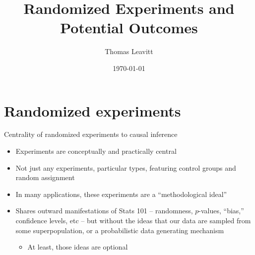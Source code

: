 \documentclass[table, xcolor = {dvipsnames}, 9pt]{beamer}
\title[]{Randomized Experiments and Potential Outcomes} %
\author{Thomas Leavitt} %
\institute[] %
{
\medskip
\textit{} %
}
\date{\today} %
\theoremstyle{plain}
\begin{document}
\begin{frame}
\titlepage %
\end{frame}


\section{Randomized experiments}
\begin{frame}{Centrality of randomized experiments to causal inference}
\vfill
\begin{itemize}
\item Experiments are conceptually and practically central \vfill
\item Not just any experiments, particular types, featuring control groups and random assignment \vfill
\item In many applications, these experiments are a ``methodological ideal'' \vfill
\item Shares outward manifestations of Stats 101 -- randomness, $p$-values, ``bias,'' confidence levels, etc -- but without the ideas that our data are sampled from some superpopulation, or a probabilistic data generating mechanism \vfill
\begin{itemize} \vfill
\item At least, those ideas are optional \vfill
\end{itemize} \vfill
\end{itemize} \vfill
\end{frame}
\end{document}
